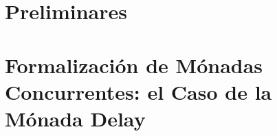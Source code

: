 \documentclass[a4paper,spanish,fixlanguage]{book}
\begin{document}




\frontmatter

\setcounter{tocdepth}{1}
\tableofcontents

\mainmatter



\part{Preliminares}\label{part:pre}





\part{Formalización de Mónadas Concurrentes: el Caso de la Mónada Delay}\label{part:mc}

 




\begin{appendices}

\end{appendices}

\backmatter




\end{document}
